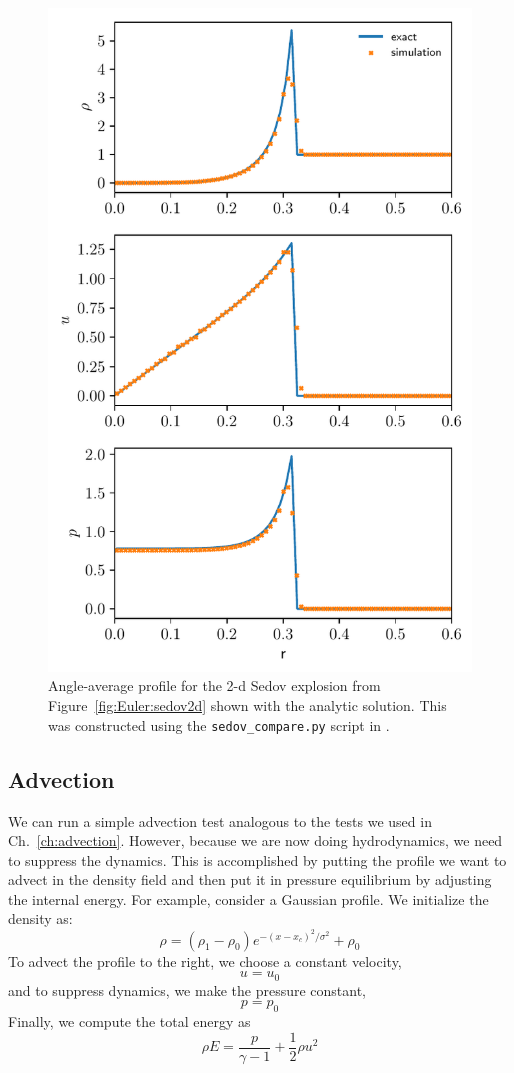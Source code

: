 \begin{figure}[t]
\centering
\includegraphics[width=0.75\linewidth]{sedov_compare}
\caption[2-d cylindrical Sedov problem]{\label{fig:Euler:sedov2d_compare} Angle-average 
  profile for the 2-d Sedov explosion from Figure~\ref{fig:Euler:sedov2d} shown
  with the analytic solution.  This was constructed using the {\tt sedov\_compare.py}
  script in \pyro.}
\end{figure}


\subsection{Advection}

We can run a simple advection test analogous to the tests we used in
Ch.~\ref{ch:advection}.  However, because we are now doing hydrodynamics,
we need to suppress the dynamics.  This is accomplished by putting the 
profile we want to advect in the density field and then put it in
pressure equilibrium by adjusting the internal energy.  For example, consider
a Gaussian profile.  We initialize the density as:
\begin{equation}
\rho = (\rho_1 - \rho_0) e^{-(x - x_c)^2/\sigma^2} + \rho_0
\end{equation}
To advect the profile to the right, we choose a constant velocity,
\begin{equation}
u = u_0
\end{equation}
and to suppress dynamics, we make the pressure constant,
\begin{equation}
p = p_0
\end{equation}
Finally, we compute the total energy as
\begin{equation}
\rho E = \frac{p}{\gamma - 1} + \frac{1}{2}\rho u^2
\end{equation}

